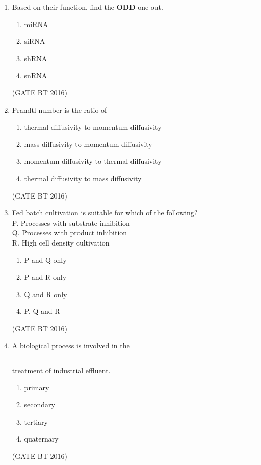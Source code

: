 \documentclass[journal,12pt,onecolumn]{IEEEtran}
\theoremstyle{remark}
\begin{document}
\begin{enumerate}
\item  Based on their function, find the \textbf{ODD} one out.
\begin{multicols}{4}
\begin{enumerate}
\item miRNA	
\item siRNA	
\item shRNA	
\item snRNA
\end{enumerate}
\end{multicols} \hfill(GATE BT 2016)   

\item Prandtl number is the ratio of
\begin{multicols}{2}
\begin{enumerate}
\item thermal diffusivity to momentum diffusivity
 \item  mass diffusivity to momentum diffusivity
\item  momentum diffusivity to thermal diffusivity
\item  thermal diffusivity to mass diffusivity
\end{enumerate} \end{multicols}
\hfill(GATE BT 2016) 

\item  Fed batch cultivation is suitable for which of the following?\\
P. Processes with substrate inhibition\\
Q. Processes with product inhibition\\
R. High cell density cultivation
\begin{multicols}{4}
\begin{enumerate}
\item P and Q only	
\item P and R only	
\item Q and R only	
\item  P, Q and R
\end{enumerate}
\end{multicols} \hfill(GATE BT 2016) 

\item A biological process is involved in the \rule{3cm}{0.4pt}
treatment of industrial effluent.
\begin{multicols}{4}
\begin{enumerate}
\item  primary
\item  secondary
\item  tertiary
\item quaternary
\end{enumerate}
\end{multicols} \hfill(GATE BT 2016)   


\end{enumerate}
\end{document}
